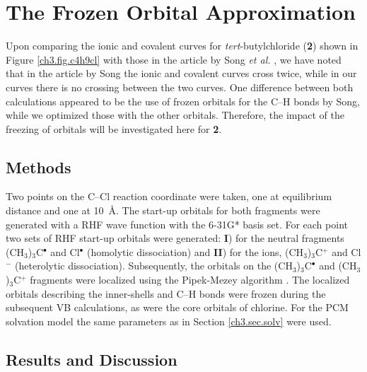 \section{The Frozen Orbital Approximation}

Upon comparing the ionic and covalent curves for \textit{tert}-butylchloride (\textbf{2}) shown in Figure \ref{ch3.fig.c4h9cl} with those in the article by Song \textit{et al.} \cite{song}, we have noted that in the article by Song the ionic and covalent curves cross twice, while in our curves there is no crossing between the two curves. One difference between both calculations appeared to be the use of frozen orbitals for the C--H bonds by Song, while we optimized those with the other orbitals. Therefore, the impact of the freezing of orbitals will be investigated here for \textbf{2}.

\subsection{Methods}

Two points on the C--Cl reaction coordinate were taken, one at equilibrium distance and one at \mbox{10 \AA}. The start-up orbitals for both fragments were generated with a RHF wave function with the 6-31G* basis set. For each point two sets of RHF start-up orbitals were generated: \textbf{I}) for the neutral fragments (CH$_3$)$_3$C$^\bullet$ and Cl$^\bullet$ (homolytic dissociation) and \textbf{II}) for the ions, (CH$_3$)$_3$C$^{+}$ and Cl$^{-}$ (heterolytic dissociation). Subsequently, the orbitals on the (CH$_3$)$_3$C$^\bullet$ and (CH$_3$)$_3$C$^{+}$ fragments were localized using the Pipek-Mezey algorithm \cite{pipek}. The localized orbitals describing the inner-shells and C--H bonds were frozen during the subsequent VB calculations, as were the core orbitals of chlorine.  For the PCM solvation model the same parameters as in Section \ref{ch3.sec.solv} were used.

\subsection{\label{ch3.sec.res.freez}Results and Discussion}

